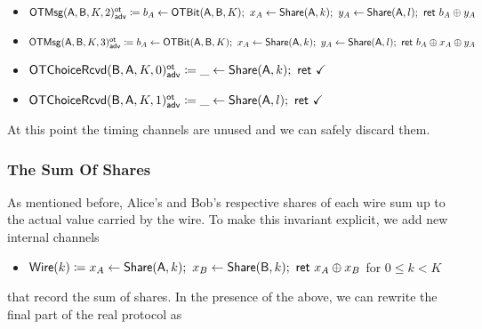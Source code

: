 \begin{itemize}
\begin{itemize}
\item {\color{blue} $\mathsf{OTMsg}(\mathsf{A},\mathsf{B},K,2)^{\mathsf{ot}}_{\mathsf{adv}} \coloneqq b_A \leftarrow \mathsf{OTBit}(\mathsf{A},\mathsf{B},K); \ x_A \leftarrow \mathsf{Share}(\mathsf{A},k); \ y_A \leftarrow \mathsf{Share}(\mathsf{A},l); \ \mathsf{ret} \ b_A \oplus y_A$}
\item {\color{blue} $\mathsf{OTMsg}(\mathsf{A},\mathsf{B},K,3)^{\mathsf{ot}}_{\mathsf{adv}} \coloneqq b_A \leftarrow \mathsf{OTBit}(\mathsf{A},\mathsf{B},K); \ x_A \leftarrow \mathsf{Share}(\mathsf{A},k); \ y_A \leftarrow \mathsf{Share}(\mathsf{A},l); \ \mathsf{ret} \ b_A \oplus x_A \oplus y_A$}\medskip
\item {\color{blue} $\mathsf{OTChoiceRcvd}(\mathsf{B},\mathsf{A},K,0)^{\mathsf{ot}}_{\mathsf{adv}} \coloneqq \_ \leftarrow \mathsf{Share}(\mathsf{A},k); \ \mathsf{ret} \ \checkmark$}
\item {\color{blue} $\mathsf{OTChoiceRcvd}(\mathsf{B},\mathsf{A},K,1)^{\mathsf{ot}}_{\mathsf{adv}} \coloneqq \_ \leftarrow \mathsf{Share}(\mathsf{A},l); \ \mathsf{ret} \ \checkmark$}
\end{itemize}
\end{itemize}

\noindent At this point the timing channels are unused and we can safely discard them.

\subsubsection{The Sum Of Shares}
As mentioned before, Alice's and Bob's respective shares of each wire sum up to the actual value carried by the wire. To make this invariant explicit, we add new internal channels
\begin{itemize}
\item $\mathsf{Wire}(k) \coloneqq x_A \leftarrow \mathsf{Share}(\mathsf{A},k); \ x_B \leftarrow \mathsf{Share}(\mathsf{B},k); \ \mathsf{ret} \ x_A \oplus x_B$ for $0 \leq k < K$
\end{itemize}
that record the sum of shares. In the presence of the above, we can rewrite the final part of the real protocol as

